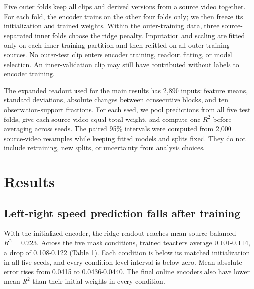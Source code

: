 \documentclass{article}
\begin{document}
Five outer folds keep all clips and derived versions from a source video
together. For each fold, the encoder trains on the other four folds
only; we then freeze its initialization and trained weights. Within the
outer-training data, three source-separated inner folds choose the ridge
penalty. Imputation and scaling are fitted only on each inner-training
partition and then refitted on all outer-training sources. No outer-test
clip enters encoder training, readout fitting, or model selection. An
inner-validation clip may still have contributed without labels to
encoder training.

The expanded readout used for the main results has 2,890 inputs: feature
means, standard deviations, absolute changes between consecutive blocks,
and ten observation-support fractions. For each seed, we pool
predictions from all five test folds, give each source video equal total
weight, and compute one \(R^2\) before averaging across seeds. The
paired 95\% intervals were computed from 2,000 source-video resamples
while keeping fitted models and splits fixed. They do not include
retraining, new splits, or uncertainty from analysis choices.

\section{Results}\label{results}

\subsection{Left-right speed prediction falls after
training}\label{left-right-speed-prediction-falls-after-training}

With the initialized encoder, the ridge readout reaches mean
source-balanced \(R^2=0.223\). Across the five mask conditions, trained
teachers average 0.101-0.114, a drop of 0.108-0.122 (Table 1). Each
condition is below its matched initialization in all five seeds, and
every condition-level interval is below zero. Mean absolute error rises
from 0.0415 to 0.0436-0.0440. The final online encoders also have lower
mean \(R^2\) than their initial weights in every condition.
\end{document}
